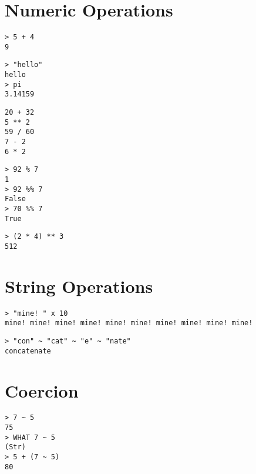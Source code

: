\section{Numeric Operations}

\begin{lstlisting}
> 5 + 4
9
\end{lstlisting}

\begin{lstlisting}
> "hello"
hello
> pi
3.14159
\end{lstlisting}

\begin{lstlisting}
20 + 32
5 ** 2
59 / 60
7 - 2
6 * 2
\end{lstlisting}

\begin{lstlisting}
> 92 % 7
1
> 92 %% 7
False
> 70 %% 7
True
\end{lstlisting}

\begin{lstlisting}
> (2 * 4) ** 3
512
\end{lstlisting}

\section{String Operations}

\begin{lstlisting}
> "mine! " x 10
mine! mine! mine! mine! mine! mine! mine! mine! mine! mine!
\end{lstlisting}

\begin{lstlisting}
> "con" ~ "cat" ~ "e" ~ "nate"
concatenate
\end{lstlisting}

\section{Coercion}

\begin{lstlisting}
> 7 ~ 5
75
> WHAT 7 ~ 5
(Str)
> 5 + (7 ~ 5)
80
\end{lstlisting}
